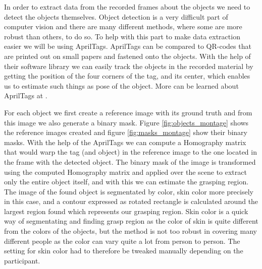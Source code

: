 In order to extract data from the recorded frames about the objects we need to detect the objects themselves. Object detection is a very difficult part of computer vision and there are many different methods, where some are more robust than others, to do so. To help with this part to make data extraction easier we will be using AprilTags. AprilTags can be compared to QR-codes that are printed out on small papers and fastened onto the objects. With the help of their software library we can easily track the objects in the recorded material by getting the position of the four corners of the tag, and its center, which enables us to estimate such things as pose of the object. More can be learned about AprilTags at \textcite{AprilTags}.

For each object we first create a reference image with its ground truth and from this image we also generate a binary mask. Figure \ref{fig:objects_montage} shows the reference images created and figure \ref{fig:masks_montage} show their binary masks. With the help of the AprilTags we can compute a Homography matrix that would warp the tag (and object) in the reference image to the one located in the frame with the detected object. The binary mask of the image is transformed using the computed Homography matrix and applied over the scene to extract only the entire object itself, and with this we can estimate the grasping region. The image of the found object is segmentated by color, skin color more precisely in this case, and a contour expressed as rotated rectangle is calculated around the largest region found which represents our grasping region. Skin color is a quick way of segmentating and finding grasp region as the color of skin is quite different from the colors of the objects, but the method is not too robust in covering many different people as the color can vary quite a lot from person to person. The setting for skin color had to therefore be tweaked manually depending on the participant.

